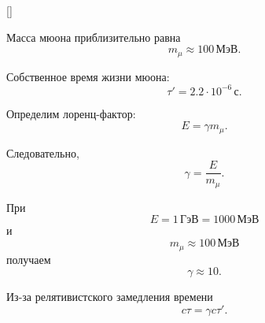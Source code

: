 \documentclass[../final.tex]{subfiles}
\begin{document}
\begin{rbox}[left=18pt,right=18pt,top=14pt,bottom=10pt]{[]}
    \centering


    \captionsetup{
        font=footnotesize,
        labelfont=bf,
        skip=5pt
    }

    \label{fig:practice02_muon}
\end{rbox}

Масса мюона приблизительно равна
%
\begin{equation*}
    m_\mu
    \approx
    100\,\text{МэВ}.
\end{equation*}

Собственное время жизни мюона:
%
\begin{equation*}
    \tau'
    =
    2.2\cdot10^{-6}\,\text{с}.
\end{equation*}

Определим лоренц-фактор:
%
\begin{equation*}
    E
    =
    \gamma m_\mu.
\end{equation*}

Следовательно,
%
\begin{equation*}
    \gamma
    =
    \frac{E}{m_\mu}.
\end{equation*}

При
%
\begin{equation*}
    E
    =
    1\,\text{ГэВ}
    =
    1000\,\text{МэВ}
\end{equation*}
%
и
%
\begin{equation*}
    m_\mu
    \approx
    100\,\text{МэВ}
\end{equation*}
%
получаем
%
\begin{equation*}
    \gamma
    \approx
    10.
\end{equation*}

Из-за релятивистского замедления времени
%
\begin{equation*}
    c\tau
    =
    \gamma c\tau'.
\end{equation*}
\end{document}
